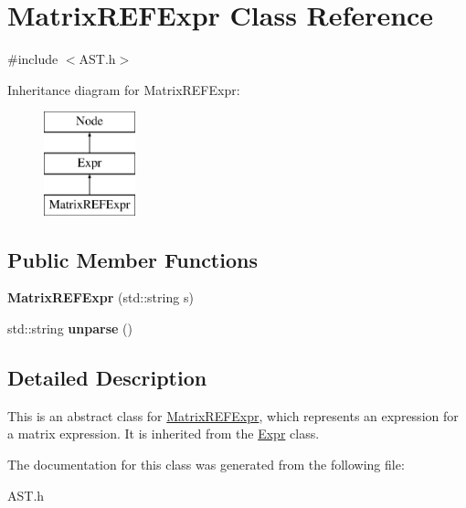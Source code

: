 \hypertarget{class_matrix_r_e_f_expr}{}\section{Matrix\+R\+E\+F\+Expr Class Reference}
\label{class_matrix_r_e_f_expr}


{\ttfamily \#include $<$A\+S\+T.\+h$>$}

Inheritance diagram for Matrix\+R\+E\+F\+Expr\+:\begin{figure}[H]
\begin{center}
\leavevmode
\includegraphics[height=3.000000cm]{class_matrix_r_e_f_expr}
\end{center}
\end{figure}
\subsection*{Public Member Functions}
\begin{DoxyCompactItemize}
\item 
\hypertarget{class_matrix_r_e_f_expr_a357fbaa87cdf777f6fe219d63ffe8e59}{}{\bfseries Matrix\+R\+E\+F\+Expr} (std\+::string s)\label{class_matrix_r_e_f_expr_a357fbaa87cdf777f6fe219d63ffe8e59}

\item 
\hypertarget{class_matrix_r_e_f_expr_a60c98e3536f5a776540f00a01ad87716}{}std\+::string {\bfseries unparse} ()\label{class_matrix_r_e_f_expr_a60c98e3536f5a776540f00a01ad87716}

\end{DoxyCompactItemize}


\subsection{Detailed Description}
This is an abstract class for \hyperlink{class_matrix_r_e_f_expr}{Matrix\+R\+E\+F\+Expr}, which represents an expression for a matrix expression. It is inherited from the \hyperlink{class_expr}{Expr} class. 

The documentation for this class was generated from the following file\+:\begin{DoxyCompactItemize}
\item 
A\+S\+T.\+h\end{DoxyCompactItemize}
